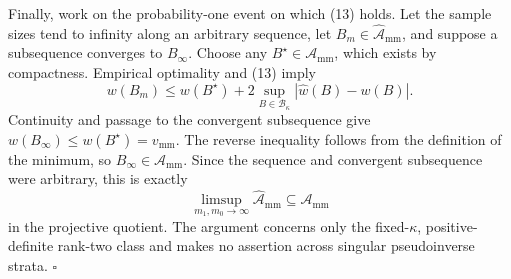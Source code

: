 Finally, work on the probability-one event on which (13) holds.  Let the sample sizes tend to infinity along an arbitrary sequence, let \(B_m\in\widehat{\mathcal A}_{\mathrm{mm}}\), and suppose a subsequence converges to \(B_\infty\).  Choose any \(B^\star\in\mathcal A_{\mathrm{mm}}\), which exists by compactness.  Empirical optimality and (13) imply
\[
w(B_m)
\le w(B^\star)+2\sup_{B\in\mathcal B_\kappa}
|\widehat w(B)-w(B)|.
\tag{15}
\]
Continuity and passage to the convergent subsequence give \(w(B_\infty)\le w(B^\star)=v_{\mathrm{mm}}\).  The reverse inequality follows from the definition of the minimum, so \(B_\infty\in\mathcal A_{\mathrm{mm}}\).  Since the sequence and convergent subsequence were arbitrary, this is exactly
\[
\limsup_{m_1,m_0\to\infty}\widehat{\mathcal A}_{\mathrm{mm}}
\subseteq\mathcal A_{\mathrm{mm}}
\]
in the projective quotient.  The argument concerns only the fixed-\(\kappa\), positive-definite rank-two class and makes no assertion across singular pseudoinverse strata. \(\square\)